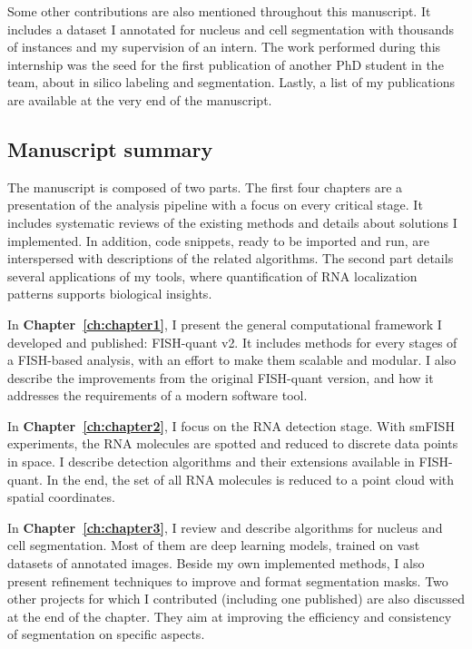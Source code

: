 \noindent
Some other contributions are also mentioned throughout this manuscript.
It includes a dataset I annotated for nucleus and cell segmentation with thousands of instances and my supervision of an intern.
The work performed during this internship was the seed for the first publication of another PhD student in the team, about in silico labeling and segmentation.
Lastly, a list of my publications are available at the very end of the manuscript.

\subsection{Manuscript summary}
\label{subsec:intro_manuscript}

The manuscript is composed of two parts.
The first four chapters are a presentation of the analysis pipeline with a focus on every critical stage.
It includes systematic reviews of the existing methods and details about solutions I implemented.
In addition, code snippets, ready to be imported and run, are interspersed with descriptions of the related algorithms.
The second part details several applications of my tools, where quantification of \ac{RNA} localization patterns supports biological insights.

In \textbf{Chapter~\ref{ch:chapter1}}, I present the general computational framework I developed and published: FISH-quant v2.
It includes methods for every stages of a \ac{FISH}-based analysis, with an effort to make them scalable and modular.
I also describe the improvements from the original FISH-quant version, and how it addresses the requirements of a modern software tool.

In \textbf{Chapter~\ref{ch:chapter2}}, I focus on the \ac{RNA} detection stage.
With \ac{smFISH} experiments, the \ac{RNA} molecules are spotted and reduced to discrete data points in space.
I describe detection algorithms and their extensions available in FISH-quant.
In the end, the set of all \ac{RNA} molecules is reduced to a point cloud with spatial coordinates.

In \textbf{Chapter~\ref{ch:chapter3}}, I review and describe algorithms for nucleus and cell segmentation.
Most of them are deep learning models, trained on vast datasets of annotated images.
Beside my own implemented methods, I also present refinement techniques to improve and format segmentation masks.
Two other projects for which I contributed (including one published) are also discussed at the end of the chapter.
They aim at improving the efficiency and consistency of segmentation on specific aspects.

